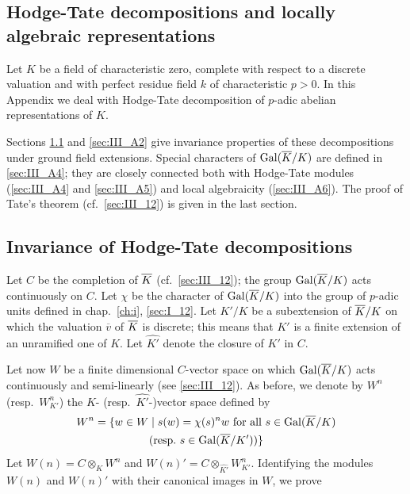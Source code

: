 \begin{subappendices}

\section{Hodge-Tate decompositions and locally algebraic representations}
\label{sec:III_App}
Let $K$ be a field of characteristic zero, complete with respect
to a discrete valuation and with perfect residue field $k$ of 
characteristic $p > 0$. In this Appendix we deal with Hodge-Tate 
decomposition of $p$-adic abelian representations of $K$.

Sections \ref{sec:III_A1} and \ref{sec:III_A2} give invariance properties of
\dpage
these decompositions under ground field extensions. Special characters of
$\operatorname{Gal}(\overline{K}/K)$ are defined in \ref{sec:III_A4}; they are closely connected
both with Hodge-Tate modules (\ref{sec:III_A4} and \ref{sec:III_A5}) and local
algebraicity (\ref{sec:III_A6}). The proof of Tate's theorem (cf.\
\ref{sec:III_12}) is given in the last section.

\subsection{Invariance of Hodge-Tate decompositions}
\label{sec:III_A1}
Let $C$ be the completion of $\overline{K}$ (cf.\ \ref{sec:III_12}); the group
$\operatorname{Gal}(\overline{K}/K)$ acts continuously on $C$. Let $\chi$ be the character of
$\operatorname{Gal}(\overline{K}/K)$ into the group of $p$-adic units defined in
chap.~\ref{ch:i}, \ref{sec:I_12}.  Let $K' / K$ be a subextension of $\overline{K}/
K$ on which the valuation $\overline{v}$ of $\overline{K}$ is discrete; this means
that $K'$ is a finite extension of an unramified one of $K$. Let $\widehat{K'}$
denote the closure of $K'$ in $C$.

Let now $W$ be a finite dimensional $C$-vector space on which $\operatorname{Gal}(\overline{K}/K)$ acts continuously and semi-linearly (see \ref{sec:III_12}). As before, we
denote by $W^n$ (resp.\ $W^n_{K'}$) the $K$- (resp.\ $\widehat{K'}$-)vector
space defined by
\begin{multline*}
	W^n = \{ w \in W \mid s(w) = \chi(s)^n w \text{ for all } s \in
	\operatorname{Gal}(\overline{K} / K) \\
	\text{(resp.\ $s \in \operatorname{Gal}(\overline{K} / K')$)} \}
\end{multline*}
Let $W(n) = C \otimes_K W^n$ and $W(n)' = C \otimes_{\widehat{K'}} W^n_{K'}$.
Identifying the modules $W(n)$ and $W(n)'$ with their canonical images in $W$,
we prove


\end{subappendices}
